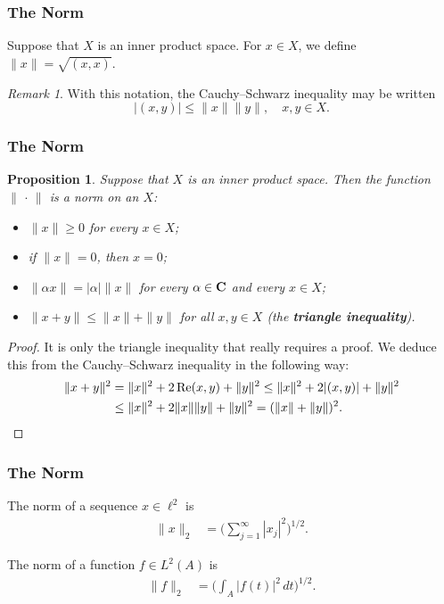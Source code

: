 \documentclass[handout]{beamer}
\newtheorem{proposition}{Proposition}
\theoremstyle{remark}
\newtheorem{remark}[theorem]{Remark}
\newcommand{\C}{{\bf C}}
\renewcommand\Re{\operatorname{Re}}
\begin{document}
\begin{frame}[shrink=10]\frametitle{The Norm}

\begin{definition}
Suppose that $X$ is an inner product space. For $x\in X$, we define $\|x\|=\sqrt{(x,x)}$.
\end{definition}

\begin{remark}
With this notation, the Cauchy--Schwarz inequality may be written
$$|(x,y)|\le\|x\|\|y\|,\quad x,y\in X.$$
\end{remark}

\end{frame}

\begin{frame}[shrink=10]\frametitle{The Norm}

\begin{proposition}
Suppose that $X$ is an inner product space. Then the function\/ $\|\,\cdot\,\|$ is a norm on an $X$\/{\rm:}
\begin{itemize}
\item[\rm(i)] $\|x\|\ge0$ for every $x\in X${\rm;}\medskip
\item[\rm(ii)] if\/ $\|x\|=0$, then $x=0${\rm;}\medskip
\item[\rm(iii)] $\|\alpha x\|=|\alpha|\|x\|$ for every $\alpha\in\C$ and every $x\in X${\rm;}\medskip
\item[\rm(iv)] $\|x+y\|\le\|x\|+\|y\|$ for all $x,y\in X$ (the {\bf triangle inequality}).
\end{itemize}
\end{proposition}

\begin{proof}
It is only the triangle inequality that really requires a proof. We deduce this from the
Cauchy--Schwarz inequality in the following way:
\begin{align*}
\|x+y\|^2&=\|x\|^2+2\Re(x,y)+\|y\|^2\le\|x\|^2+2|(x,y)|+\|y\|^2\\
&\le\|x\|^2+2\|x\|\|y\|+\|y\|^2=(\|x\|+\|y\|)^2.\qedhere
\end{align*}
\end{proof}

\end{frame}

\begin{frame}\frametitle{The Norm}

\begin{example}
The norm of a sequence $x\in\ell^2$ is
\begin{align*}
\|x\|_2&=\biggl(\sum^\infty_{j=1}|x_j|^2\biggr)^{1/2}.
\end{align*}
\end{example}

\begin{example}
The norm of a function $f\in L^2(A)$ is
\begin{align*}
\|f\|_2&=\biggl(\int_A|f(t)|^2\,dt\biggr)^{1/2}.
\end{align*}
\end{example}

\end{frame}
\end{document}
